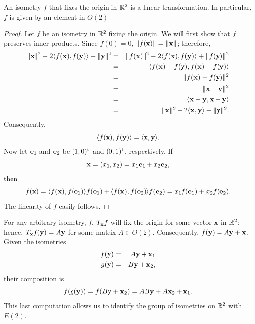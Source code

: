  
\begin{lemma}
An isometry $f$ that fixes the origin in ${\Bbb R}^2$ is a linear
transformation.  In particular, $f$ is given by an element in $O(2)$. 
\end{lemma}
 
 
\begin{proof}
Let $f$ be an isometry in ${\Bbb R}^2$ fixing the origin. We will
first show that $f$ preserves inner products. Since $f(0) = 0$, $\|
f({\bold x})\| = \| {\bold x} \|$; therefore,
\begin{eqnarray*}
\| {\bold x} \|^2 - 2 \langle f({\bold x}), f({\bold y}) \rangle + \|
{\bold y} \|^2 
& = &
\| f({\bold x}) \|^2 - 2 \langle f({\bold x}), f({\bold y}) \rangle +
\| f({\bold y}) \|^2 \\ 
& = &
\langle
f({\bold x}) -  f({\bold y}), f({\bold x}) -  f({\bold y})
\rangle \\
& = &
\| f({\bold x}) -  f({\bold y}) \|^2 \\
& = &
\| {\bold x} -  {\bold y} \|^2 \\
& = &
\langle
{\bold x} -  {\bold y}, {\bold x} -  {\bold y} \rangle \\
& = &
\| {\bold x} \|^2 - 2 \langle {\bold x}, {\bold y} \rangle + \| {\bold
y} \|^2. 
\end{eqnarray*}
Consequently,
\[
\langle f({\bold x}), f({\bold y}) \rangle
=
\langle {\bold x}, {\bold y} \rangle.
\]
Now let ${\bold e}_1$ and ${\bold e_2}$ be $(1, 0)^{\rm t}$ and $(0,
1)^{\rm t}$, respectively. If 
\[
{\bold x} = (x_1, x_2) = x_1 {\bold e}_1 + x_2 {\bold e}_2,
\]
then
\[
f({\bold x})
=
\langle
f({\bold x}), f({\bold e}_1)
\rangle
f({\bold e}_1)
+\langle
f({\bold x}), f({\bold e}_2)
\rangle
f({\bold e}_2)
=
x_1 f({\bold e}_1)+x_2 f({\bold e}_2).
\]
The linearity of $f$ easily follows.
\end{proof}
 
 
\medskip
 
 
For any arbitrary isometry, $f$,  $T_{\bold x} f$ will fix the origin
for some vector ${\bold x}$ in ${\Bbb R}^2$; hence, $T_{\bold x}
f({\bold y}) = A {\bold y}$ for some matrix $A \in O(2)$.
Consequently, $f({\bold y}) = A {\bold y} + {\bold x}$.  Given the
isometries 
\begin{eqnarray*}
f({\bold y}) & = & A {\bold y} + {\bold x}_1 \\
g({\bold y}) & = & B {\bold y} + {\bold x}_2,
\end{eqnarray*}
their composition is
\[
f(g({\bold y})) =
f(B {\bold y} + {\bold x}_2) =
AB {\bold y} + A{\bold x}_2 + {\bold x}_1.
\]
This last computation allows us to identify the group of isometries on
${\Bbb R}^2$ with~$E(2)$. 
 
